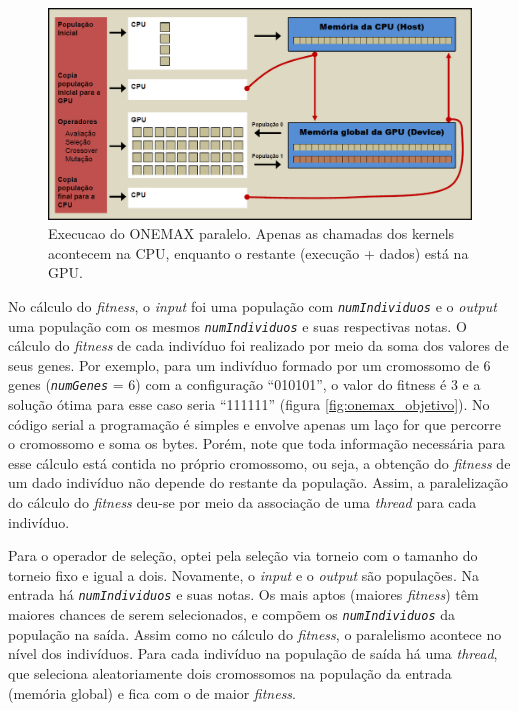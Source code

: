 	\begin{figure}[htbp]
		\centering
			\includegraphics[width=1.00\textwidth]{figs/resultados/onemax/onemax_execucao.png}
		\caption{Execucao do ONEMAX paralelo. Apenas as chamadas dos kernels acontecem na CPU, enquanto o restante (execução + dados) está na GPU.}
		\label{fig:onemax_execucao}
	\end{figure}
		
	No cálculo do \emph{fitness}, o \emph{input} foi uma população com \textit{\texttt{numIndividuos}} e o \emph{output} uma população com os mesmos \textit{\texttt{numIndividuos}} e suas respectivas notas. O cálculo do \emph{fitness} de cada indivíduo foi realizado por meio da soma dos valores de seus genes. Por exemplo, para um indivíduo formado por um cromossomo de 6 genes (\textit{\texttt{numGenes}} = 6) com a configuração “010101”, o valor do fitness é 3 e a solução ótima para esse caso seria “111111” (figura \ref{fig:onemax_objetivo}). No código serial a programação é simples e envolve apenas um laço for que percorre o cromossomo e soma os bytes. Porém, note que toda informação necessária para esse cálculo está contida no próprio cromossomo, ou seja, a obtenção do \emph{fitness} de um dado indivíduo não depende do restante da população. Assim, a paralelização do cálculo do \emph{fitness} deu-se por meio da associação de uma \emph{thread} para cada indivíduo.
	
	Para o operador de seleção, optei pela seleção via torneio com o tamanho do torneio fixo e igual a dois. Novamente, o \emph{input} e o \emph{output} são populações. Na entrada há \textit{\texttt{numIndividuos}} e suas notas. Os mais aptos (maiores \emph{fitness}) têm maiores chances de serem selecionados, e compõem os \textit{\texttt{numIndividuos}} da população na saída. Assim como no cálculo do \emph{fitness}, o paralelismo acontece no nível dos indivíduos. Para cada indivíduo na população de saída há uma \emph{thread}, que seleciona aleatoriamente dois cromossomos na população da entrada (memória global) e fica com o de maior \emph{fitness}.

